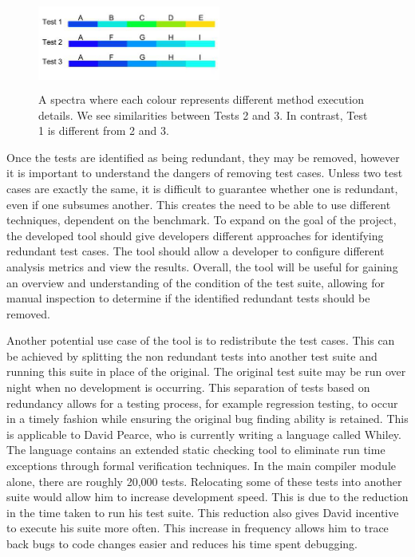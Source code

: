 \begin{figure}[h]
\centering
\includegraphics[width=6cm,height=3cm]{spectra.png}
\caption{A spectra where each colour represents different method execution details. We see similarities between Tests 2 and 3. In contrast, Test 1 is different from 2 and 3. }
\label{fig:spectra}
\end{figure}

Once the tests are identified as being redundant, they may be removed, however it is important to understand the dangers of removing test cases. Unless two test cases are exactly the same, it is difficult to guarantee whether one is redundant, even if one subsumes another. This creates the need to be able to use different techniques, dependent on the benchmark. To expand on the goal of the project, the developed tool should give developers different approaches for identifying redundant test cases. The tool should allow a developer to configure different analysis metrics and view the results. Overall, the tool will be useful for gaining an overview and understanding of the condition of the test suite, allowing for manual inspection to determine if the identified redundant tests should be removed.

Another potential use case of the tool is to redistribute the test cases. This can be achieved by splitting the non redundant tests into another test suite and running this suite in place of the original. The original test suite may be run over night when no development is occurring. This separation of tests based on redundancy allows for a testing process, for example regression testing, to occur in a timely fashion while ensuring the original bug finding ability is retained. This is applicable to David Pearce, who is currently writing a language called Whiley. The language contains an extended static checking tool to eliminate run time exceptions through formal verification techniques. In the main compiler module alone, there are roughly 20,000 tests. Relocating some of these tests into another suite would allow him to increase development speed. This is due to the reduction in the time taken to run his test suite. This reduction also gives David incentive to execute his suite more often. This increase in frequency allows him to trace back bugs to code changes easier and reduces his time spent debugging. 

